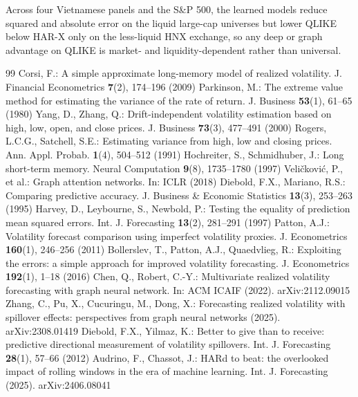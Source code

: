 \documentclass[runningheads]{llncs}
\begin{document}
Across four
Vietnamese panels and the S\&P 500, the learned models reduce squared and absolute error on the liquid
large-cap universes but lower QLIKE below HAR-X only on the less-liquid HNX exchange, so any deep or graph
advantage on QLIKE is market- and liquidity-dependent rather than universal.

\begin{thebibliography}{99}
 Corsi, F.: A simple approximate long-memory model of realized volatility. J. Financial Econometrics \textbf{7}(2), 174--196 (2009)
 Parkinson, M.: The extreme value method for estimating the variance of the rate of return. J. Business \textbf{53}(1), 61--65 (1980)
 Yang, D., Zhang, Q.: Drift-independent volatility estimation based on high, low, open, and close prices. J. Business \textbf{73}(3), 477--491 (2000)
 Rogers, L.C.G., Satchell, S.E.: Estimating variance from high, low and closing prices. Ann. Appl. Probab. \textbf{1}(4), 504--512 (1991)
 Hochreiter, S., Schmidhuber, J.: Long short-term memory. Neural Computation \textbf{9}(8), 1735--1780 (1997)
 Veli\v{c}kovi\'c, P., et al.: Graph attention networks. In: ICLR (2018)
 Diebold, F.X., Mariano, R.S.: Comparing predictive accuracy. J. Business \& Economic Statistics \textbf{13}(3), 253--263 (1995)
 Harvey, D., Leybourne, S., Newbold, P.: Testing the equality of prediction mean squared errors. Int. J. Forecasting \textbf{13}(2), 281--291 (1997)
 Patton, A.J.: Volatility forecast comparison using imperfect volatility proxies. J. Econometrics \textbf{160}(1), 246--256 (2011)
 Bollerslev, T., Patton, A.J., Quaedvlieg, R.: Exploiting the errors: a simple approach for improved volatility forecasting. J. Econometrics \textbf{192}(1), 1--18 (2016)
 Chen, Q., Robert, C.-Y.: Multivariate realized volatility forecasting with graph neural network. In: ACM ICAIF (2022). arXiv:2112.09015
 Zhang, C., Pu, X., Cucuringu, M., Dong, X.: Forecasting realized volatility with spillover effects: perspectives from graph neural networks (2025). arXiv:2308.01419
 Diebold, F.X., Yilmaz, K.: Better to give than to receive: predictive directional measurement of volatility spillovers. Int. J. Forecasting \textbf{28}(1), 57--66 (2012)
 Audrino, F., Chassot, J.: HARd to beat: the overlooked impact of rolling windows in the era of machine learning. Int. J. Forecasting (2025). arXiv:2406.08041
\end{thebibliography}
\end{document}

